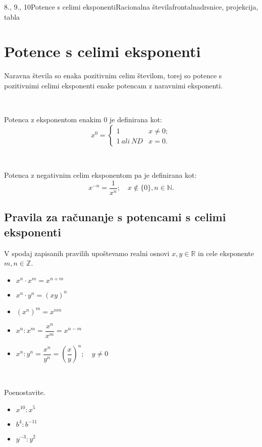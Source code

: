 \begin{priprava}{8., 9., 10}{}{Potence s celimi eksponenti}{Racionalna števila}{frontalna}{drsnice, projekcija, tabla}

    \section{Potence s celimi eksponenti}

            Naravna števila so enaka pozitivnim celim številom, torej so potence s pozitivnimi celimi eksponenti enake potencam z naravnimi eksponenti.

            ~

            Potenca z eksponentom enakim $0$ je definirana kot: 
            $$x^0=\begin{cases}
                    1 &x\neq 0; \\
                    1 ~ali~ND &x=0.
                \end{cases}$$

            ~

            Potenca z negativnim celim eksponentom pa je definirana kot:
            $$x^{-n}=\dfrac{1}{x^n}; \quad x\notin\{0\}, n\in\mathbb{N}.$$

            
        \subsection*{Pravila za računanje s potencami s celimi eksponenti}
            V spodaj zapisanih pravilih upoštevamo realni osnovi $x,y\in\mathbb{R}$ in cele eksponente $m,n\in\mathbb{Z}$.
            \begin{itemize}
                \item $x^n\cdot x^m=x^{n+m}$
                \item $x^n\cdot y^n=(xy)^n$
                \item $\left(x^n\right)^m=x^{nm}$
                \item $x^n:x^m=\dfrac{x^n}{x^m}=x^{n-m}$
                \item $x^n:y^n=\dfrac{x^n}{y^n}=\left(\dfrac{x}{y}\right)^n; \quad y\neq 0$
            \end{itemize}


    ~\\
    \begin{multicols}{2}
            \begin{naloga}
                Poenostavite.
                \begin{itemize}
                    \item $x^{10}:x^5$ 
                    \item $b^4:b^{-11}$ 
                    \item $y^{-3}:y^2$ 
                \end{itemize}
            \end{naloga}


\end{multicols}
\end{priprava}
